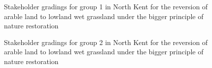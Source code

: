 \documentclass[
  12pt,
  letterpaper,
  DIV=11,
  numbers=noendperiod]{scrartcl}
\begin{document}
\begin{figure}[H]


\caption{\label{fig-NKArMoreG1}Stakeholder gradings for group 1 in North
Kent for the reversion of arable land to lowland wet grassland under the
bigger principle of nature restoration}

\end{figure}%

\begin{figure}[H]


\caption{\label{fig-NKArMoreG2}Stakeholder gradings for group 2 in North
Kent for the reversion of arable land to lowland wet grassland under the
bigger principle of nature restoration}

\end{figure}%
\end{document}
